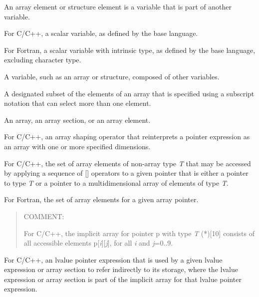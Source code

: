 \begin{adjustwidth}{-0.75in}{0in}
\begin{note}
An array element or structure element is a variable that is part of 
another variable.
\end{note}
\end{adjustwidth}
\glossarydefend

\glossarydefstart
For C/C++, a scalar variable, as defined by the base language.

For Fortran, a scalar variable with intrinsic type, as defined by 
the base language, excluding character type.
\glossarydefend

\glossarydefstart
A variable, such as an array or structure, composed of other variables.
\glossarydefend

\glossarydefstart
A designated subset of the elements of an array that is specified using a
subscript notation that can select more than one element.
\glossarydefend

\glossarydefstart
An array, an array section, or an array element.
\glossarydefend

\glossarydefstart
For C/C++, an array shaping operator that reinterprets a pointer expression as
an array with one or more specified dimensions.
\glossarydefend

\glossarydefstart
For C/C++, the set of array elements of non-array type \emph{T} that may be
accessed by applying a sequence of [] operators to a given pointer that is
either a pointer to type \emph{T} or a pointer to a multidimensional array of
elements of type \emph{T}.

For Fortran, the set of array elements for a given array pointer.
\begin{quote}
COMMENT:

For C/C++, the implicit array for pointer p with type \emph{T} (*)[10] 
consists of all accessible elements p[\emph{i}][\emph{j}], for all 
\emph{i} and \emph{j}=0..9.
\end{quote}
\glossarydefend

\glossarydefstart
For C/C++, an lvalue pointer expression that is used by a given lvalue
expression or array section to refer indirectly to its storage, where
the lvalue expression or array section is part of the implicit array for that
lvalue pointer expression.

